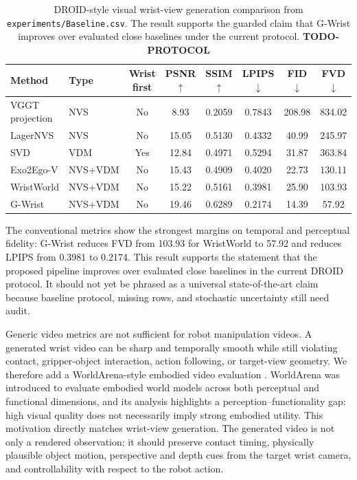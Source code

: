 \documentclass[letterpaper]{article}
\newcommand{\method}{G-Wrist}
\newcommand{\todo}[1]{\textbf{TODO-#1}}
\begin{document}
\begin{table}[t]
\caption{DROID-style visual wrist-view generation comparison from \texttt{experiments/Baseline.csv}. The result supports the guarded claim that \method{} improves over evaluated close baselines under the current protocol. \todo{PROTOCOL}}
\label{tab:visual}
\centering
\small
\begin{tabular}{llcccccc}
\toprule
Method & Type & Wrist first & PSNR $\uparrow$ & SSIM $\uparrow$ & LPIPS $\downarrow$ & FID $\downarrow$ & FVD $\downarrow$ \\
\midrule
VGGT projection \cite{wang2025vggt} & NVS & No & 8.93 & 0.2059 & 0.7843 & 208.98 & 834.02 \\
LagerNVS \cite{szymanowicz2026lagernvs} & NVS & No & 15.05 & 0.5130 & 0.4332 & 40.99 & 245.97 \\
SVD \cite{blattmann2023svd} & VDM & Yes & 12.84 & 0.4971 & 0.5294 & 31.87 & 363.84 \\
Exo2Ego-V \cite{liu2024exo2ego} & NVS+VDM & No & 15.43 & 0.4909 & 0.4020 & 22.73 & 130.11 \\
WristWorld \cite{qian2025wristworld} & NVS+VDM & No & 15.22 & 0.5161 & 0.3981 & 25.90 & 103.93 \\
\method{} & NVS+VDM & No & 19.46 & 0.6289 & 0.2174 & 14.39 & 57.92 \\
\bottomrule
\end{tabular}
\end{table}

The conventional metrics show the strongest margins on temporal and perceptual fidelity: \method{} reduces FVD from 103.93 for WristWorld to 57.92 and reduces LPIPS from 0.3981 to 0.2174.
This result supports the statement that the proposed pipeline improves over evaluated close baselines in the current DROID protocol.
It should not yet be phrased as a universal state-of-the-art claim because baseline protocol, missing rows, and stochastic uncertainty still need audit.

Generic video metrics are not sufficient for robot manipulation videos.
A generated wrist video can be sharp and temporally smooth while still violating contact, gripper-object interaction, action following, or target-view geometry.
We therefore add a WorldArena-style embodied video evaluation \cite{shang2026worldarena}.
WorldArena was introduced to evaluate embodied world models across both perceptual and functional dimensions, and its analysis highlights a perception--functionality gap: high visual quality does not necessarily imply strong embodied utility.
This motivation directly matches wrist-view generation.
The generated video is not only a rendered observation; it should preserve contact timing, physically plausible object motion, perspective and depth cues from the target wrist camera, and controllability with respect to the robot action.
\end{document}
